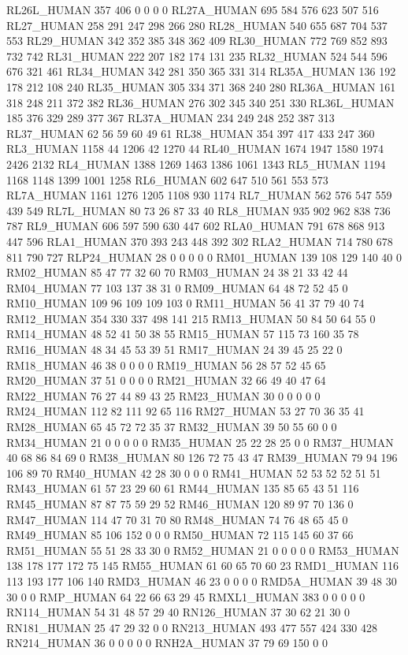 RL26L_HUMAN	357	406	0	0	0	0
RL27A_HUMAN	695	584	576	623	507	516
RL27_HUMAN	258	291	247	298	266	280
RL28_HUMAN	540	655	687	704	537	553
RL29_HUMAN	342	352	385	348	362	409
RL30_HUMAN	772	769	852	893	732	742
RL31_HUMAN	222	207	182	174	131	235
RL32_HUMAN	524	544	596	676	321	461
RL34_HUMAN	342	281	350	365	331	314
RL35A_HUMAN	136	192	178	212	108	240
RL35_HUMAN	305	334	371	368	240	280
RL36A_HUMAN	161	318	248	211	372	382
RL36_HUMAN	276	302	345	340	251	330
RL36L_HUMAN	185	376	329	289	377	367
RL37A_HUMAN	234	249	248	252	387	313
RL37_HUMAN	62	56	59	60	49	61
RL38_HUMAN	354	397	417	433	247	360
RL3_HUMAN	1158	44	1206	42	1270	44
RL40_HUMAN	1674	1947	1580	1974	2426	2132
RL4_HUMAN	1388	1269	1463	1386	1061	1343
RL5_HUMAN	1194	1168	1148	1399	1001	1258
RL6_HUMAN	602	647	510	561	553	573
RL7A_HUMAN	1161	1276	1205	1108	930	1174
RL7_HUMAN	562	576	547	559	439	549
RL7L_HUMAN	80	73	26	87	33	40
RL8_HUMAN	935	902	962	838	736	787
RL9_HUMAN	606	597	590	630	447	602
RLA0_HUMAN	791	678	868	913	447	596
RLA1_HUMAN	370	393	243	448	392	302
RLA2_HUMAN	714	780	678	811	790	727
RLP24_HUMAN	28	0	0	0	0	0
RM01_HUMAN	139	108	129	140	40	0
RM02_HUMAN	85	47	77	32	60	70
RM03_HUMAN	24	38	21	33	42	44
RM04_HUMAN	77	103	137	38	31	0
RM09_HUMAN	64	48	72	52	45	0
RM10_HUMAN	109	96	109	109	103	0
RM11_HUMAN	56	41	37	79	40	74
RM12_HUMAN	354	330	337	498	141	215
RM13_HUMAN	50	84	50	64	55	0
RM14_HUMAN	48	52	41	50	38	55
RM15_HUMAN	57	115	73	160	35	78
RM16_HUMAN	48	34	45	53	39	51
RM17_HUMAN	24	39	45	25	22	0
RM18_HUMAN	46	38	0	0	0	0
RM19_HUMAN	56	28	57	52	45	65
RM20_HUMAN	37	51	0	0	0	0
RM21_HUMAN	32	66	49	40	47	64
RM22_HUMAN	76	27	44	89	43	25
RM23_HUMAN	30	0	0	0	0	0
RM24_HUMAN	112	82	111	92	65	116
RM27_HUMAN	53	27	70	36	35	41
RM28_HUMAN	65	45	72	72	35	37
RM32_HUMAN	39	50	55	60	0	0
RM34_HUMAN	21	0	0	0	0	0
RM35_HUMAN	25	22	28	25	0	0
RM37_HUMAN	40	68	86	84	69	0
RM38_HUMAN	80	126	72	75	43	47
RM39_HUMAN	79	94	196	106	89	70
RM40_HUMAN	42	28	30	0	0	0
RM41_HUMAN	52	53	52	52	51	51
RM43_HUMAN	61	57	23	29	60	61
RM44_HUMAN	135	85	65	43	51	116
RM45_HUMAN	87	87	75	59	29	52
RM46_HUMAN	120	89	97	70	136	0
RM47_HUMAN	114	47	70	31	70	80
RM48_HUMAN	74	76	48	65	45	0
RM49_HUMAN	85	106	152	0	0	0
RM50_HUMAN	72	115	145	60	37	66
RM51_HUMAN	55	51	28	33	30	0
RM52_HUMAN	21	0	0	0	0	0
RM53_HUMAN	138	178	177	172	75	145
RM55_HUMAN	61	60	65	70	60	23
RMD1_HUMAN	116	113	193	177	106	140
RMD3_HUMAN	46	23	0	0	0	0
RMD5A_HUMAN	39	48	30	30	0	0
RMP_HUMAN	64	22	66	63	29	45
RMXL1_HUMAN	383	0	0	0	0	0
RN114_HUMAN	54	31	48	57	29	40
RN126_HUMAN	37	30	62	21	30	0
RN181_HUMAN	25	47	29	32	0	0
RN213_HUMAN	493	477	557	424	330	428
RN214_HUMAN	36	0	0	0	0	0
RNH2A_HUMAN	37	79	69	150	0	0
